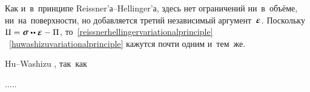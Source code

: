 \begin{otherlanguage}{russian}
Как и~в~принципе Reissner’а--Hellinger’а,
здесь нет ограничений ни~в~объёме, ни~на~поверхности,
но добавляется третий независимый аргумент~$\infinitesimaldeformation$.
Поскольку
${\complementaryenergydensity = \linearstress \dotdotp \infinitesimaldeformation - \potentialenergydensity}$,
то~\eqref{reissnerhellingervariationalprinciple}
~\eqref{huwashizuvariationalprinciple}
кажутся почти одним и~тем~же.

Hu\hbox{--}Washizu
,
так~как

.....

\end{otherlanguage}
